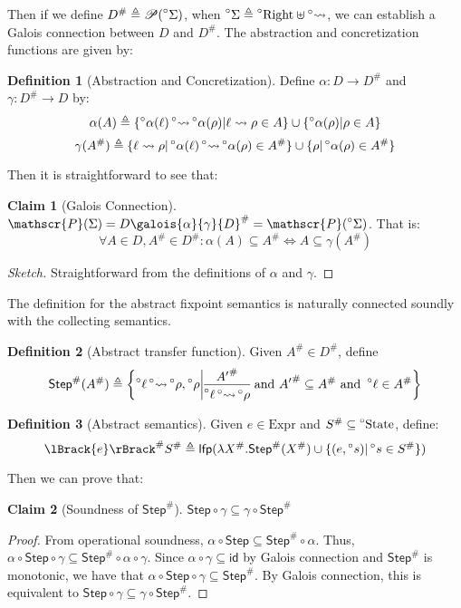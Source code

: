 \documentclass{article}
\theoremstyle{definition}
\newtheorem{definition}{Definition}[section]
\newtheorem{clm}{Claim}[section]
\newcommand*{\pset}{\mathscr{P}}
\newcommand*{\A}[1]{\prescript{\circ}{}{#1}}
\newcommand*{\Abs}[1]{{#1}^{\#}}
\newcommand*{\Expr}{\text{Expr}}
\newcommand*{\Right}{\text{Right}}
\newcommand*{\State}{\text{State}}
\newcommand*{\lfp}{\mathsf{lfp}}
\newcommand*{\Step}{\mathsf{Step}}
\newcommand*{\semarrow}{\rightsquigarrow}
\newcommand*{\asemarrow}{\A{\rightsquigarrow}}
\newcommand*{\sembracket}[1]{\lBrack{#1}\rBrack}
\begin{document}
Then if we define $\Abs{D}\triangleq\pset(\A\Sigma)$, when $\A\Sigma\triangleq\A\Right\uplus\A\semarrow$, we can establish a Galois connection between $D$ and $\Abs{D}$.
The abstraction and concretization functions are given by:
\begin{definition}[Abstraction and Concretization]
  Define $\alpha:D\rightarrow\Abs{D}$ and $\gamma:\Abs{D}\rightarrow D$ by:
  \[
    \alpha(A)\triangleq\{\A\alpha(\ell)\asemarrow\A\alpha(\rho)|\ell\semarrow\rho\in A\}\cup\{\A\alpha(\rho)|\rho\in A\}
  \]
  \[
    \gamma(\Abs{A})\triangleq\{\ell\semarrow\rho|\A\alpha(\ell)\asemarrow\A\alpha(\rho)\in\Abs{A}\}\cup\{\rho|\A\alpha(\rho)\in\Abs{A}\}
  \]
\end{definition}

Then it is straightforward to see that:
\begin{clm}[Galois Connection]
  $\pset(\Sigma)=D\galois{\alpha}{\gamma}\Abs{D}=\pset(\A\Sigma)$. That is:
  \[\forall A\in D,\Abs{A}\in\Abs{D}:\alpha(A)\subseteq\Abs{A}\Leftrightarrow A\subseteq\gamma(\Abs{A})\]
\end{clm}
\begin{proof}[Sketch]
  Straightforward from the definitions of $\alpha$ and $\gamma$.
\end{proof}

The definition for the abstract fixpoint semantics is naturally connected soundly with the collecting semantics.
\begin{definition}[Abstract transfer function]
  Given $\Abs{A}\in\Abs{D}$, define
  \[
    \Abs{\mathsf{Step}}(\Abs{A})\triangleq
    \left\{\A\ell\A\semarrow\A\rho, \A\rho\middle|
    \begin{prooftree}[center=true]
      \hypo{\Abs{A'}}\infer1{\A\ell\A\semarrow\A\rho}
    \end{prooftree}\text{ and }
    \Abs{A'}\subseteq \Abs{A}\text{ and }\A\ell\in\Abs{A}
    \right\}
  \]
\end{definition}
\begin{definition}[Abstract semantics]
  Given $e\in\Expr$ and $\Abs{S}\subseteq\A\State$, define:
  \[
    \Abs{\sembracket{e}}\Abs{S}\triangleq\lfp(\lambda \Abs{X}.\Abs{\mathsf{Step}}(\Abs{X})\cup\{(e,\A{s})|\A{s}\in \Abs{S}\})
  \]
\end{definition}
Then we can prove that:
\begin{clm}[Soundness of $\Abs\Step$]
  $\Step\circ\gamma\subseteq\gamma\circ\Abs\Step$
\end{clm}
\begin{proof}
  From operational soundness, $\alpha\circ\Step\subseteq\Abs\Step\circ\alpha$.
  Thus, $\alpha\circ\Step\circ\gamma\subseteq\Abs\Step\circ\alpha\circ\gamma$.
  Since $\alpha\circ\gamma\subseteq\mathsf{id}$ by Galois connection and $\Abs\Step$ is monotonic, we have that $\alpha\circ\Step\circ\gamma\subseteq\Abs\Step$.
  By Galois connection, this is equivalent to $\Step\circ\gamma\subseteq\gamma\circ\Abs\Step$.
\end{proof}
\end{document}
